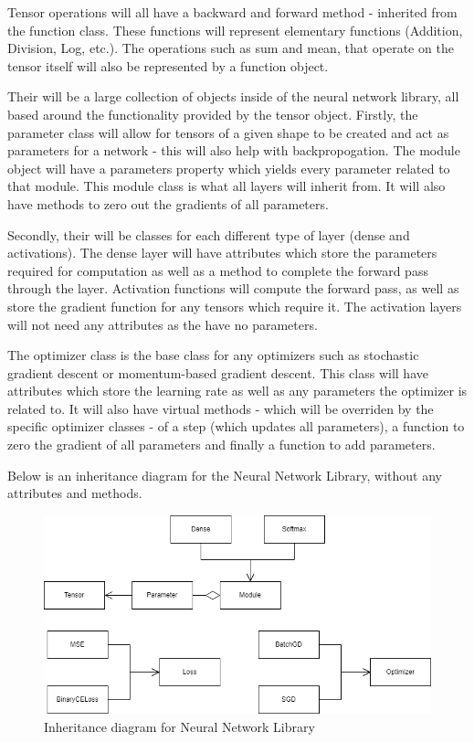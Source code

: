 \documentclass{article}
\makeatletter
\newcommand\subsubsubsection{\@startsection{paragraph}{4}{\z@}{-2.5ex\@plus -1ex \@minus -.25ex}{1.25ex \@plus .25ex}{\normalfont\normalsize\bfseries}}
\makeatother
\begin{document}
    Tensor operations will all have a backward and forward method - inherited from the function class. These functions will represent elementary functions (Addition, Division, Log, etc.). 
    The operations such as sum and mean, that operate on the tensor itself will also be represented by a function object.

    \subsubsubsection{Neural Network Library}
    Their will be a large collection of objects inside of the neural network library, all based around the functionality provided by the tensor object.
    Firstly, the parameter class will allow for tensors of a given shape to be created and act as parameters for a network - this will also help with backpropogation.
    The module object will have a parameters property which yields every parameter related to that module. This module class is what all layers will inherit from. It will also
    have methods to zero out the gradients of all parameters.

    Secondly, their will be classes for each different type of layer (dense and activations). The dense layer will have attributes which store the parameters required
    for computation as well as a method to complete the forward pass through the layer. Activation functions will compute the forward pass, as well as store the gradient function
    for any tensors which require it. The activation layers will not need any attributes as the have no parameters.

    The optimizer class is the base class for any optimizers such as stochastic gradient descent or momentum-based gradient descent. This class will have attributes which store
    the learning rate as well as any parameters the optimizer is related to. It will also have virtual methods - which will be overriden by the specific optimizer classes - of
    a step (which updates all parameters), a function to zero the gradient of all parameters and finally a function to add parameters.

    Below is an inheritance diagram for the Neural Network Library, without any attributes and methods.

    \begin{figure}[h]
        \centering
        \includegraphics[scale=0.5]{NNUML (simple).drawio.png}
        \caption{Inheritance diagram for Neural Network Library}
    \end{figure}
\end{document}
